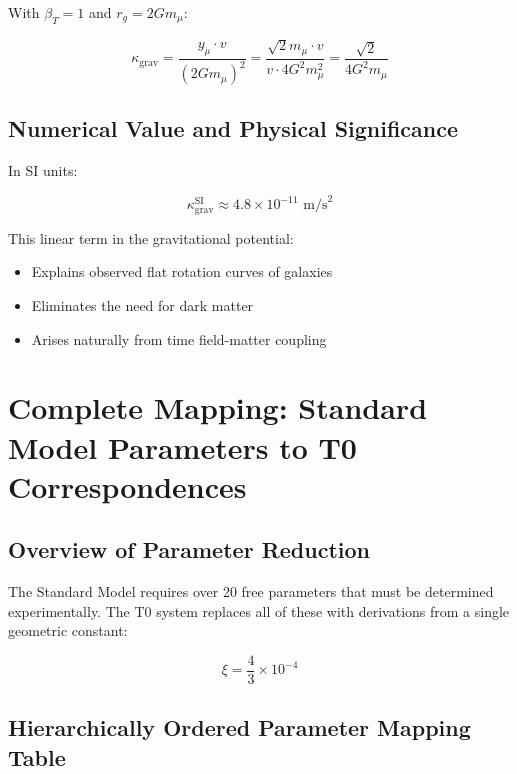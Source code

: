	With $\beta_T = 1$ and $r_g = 2Gm_\mu$:
	
	\begin{equation}
		\kappa_{\text{grav}} = \frac{y_\mu \cdot v}{(2Gm_\mu)^2} = \frac{\sqrt{2} m_\mu \cdot v}{v \cdot 4G^2m_\mu^2} = \frac{\sqrt{2}}{4G^2m_\mu}
	\end{equation}
	
	\subsection{Numerical Value and Physical Significance}
	
	In SI units:
	
	\begin{equation}
		\kappa_{\text{grav}}^{\text{SI}} \approx 4.8 \times 10^{-11} \text{ m/s}^2
	\end{equation}
	
	This linear term in the gravitational potential:
	\begin{itemize}
		\item Explains observed flat rotation curves of galaxies
		\item Eliminates the need for dark matter
		\item Arises naturally from time field-matter coupling
	\end{itemize}
	
\section{Complete Mapping: Standard Model Parameters to T0 Correspondences}
\label{sec:sm_t0_mapping}

\subsection{Overview of Parameter Reduction}
\label{subsec:parameter_overview}

The Standard Model requires over 20 free parameters that must be determined experimentally. The T0 system replaces all of these with derivations from a single geometric constant:

\begin{equation}
	\boxed{\xi = \frac{4}{3} \times 10^{-4}}
\end{equation}

\subsection{Hierarchically Ordered Parameter Mapping Table}
\label{subsec:hierarchical_mapping}

